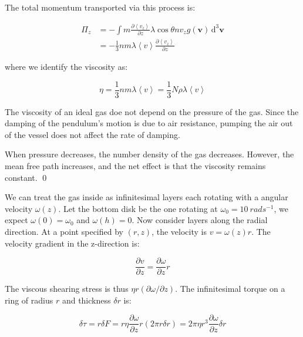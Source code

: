 \documentclass[12pt]{article}
\begin{document}
The total momentum transported via this process is:

\begin{equation}
\begin{split}
    \Pi_{z} &= -\int m \frac{\partial \left\langle v_{z} \right\rangle}{\partial z} \lambda \cos{\theta} n v_{z} g(\mathbf{v}) \, \mathrm{d}^{3} \mathbf{v} \\
    &= -\frac{1}{3} n m \lambda \left\langle v \right\rangle \frac{\partial \left\langle v_{z} \right\rangle}{\partial z}
\end{split}
\end{equation}

where we identify the viscosity as:

\begin{equation}
    \eta = \frac{1}{3} n m \lambda \left\langle v \right\rangle = \frac{1}{3} N \rho \lambda \left\langle v \right\rangle
\end{equation}

The viscosity of an ideal gas doe not depend on the pressure of the gas. Since the damping of the pendulum's motion is due to air resistance, pumping the air out of the vessel does not affect the rate of damping.

When pressure decreases, the number density of the gas decreases. However, the mean free path increases, and the net effect is that the viscosity remains constant.
\qed


We can treat the gas inside as infinitesimal layers each rotating with a angular velocity $\omega(z)$. Let the bottom disk be the one rotating at $\omega_{0} = \qty{10}{rad s^{-1}}$, we expect $\omega(0) = \omega_{0}$ and $\omega(h) = 0$. Now consider layers along the radial direction. At a point specified by $(r, z)$, the velocity is $v = \omega(z) r$. The velocity gradient in the z-direction is:

\begin{equation}
    \frac{\partial v}{\partial z} = \frac{\partial \omega}{\partial z} r
\end{equation}

The viscous shearing stress is thus $\eta r (\partial \omega/\partial z)$. The infinitesimal torque on a ring of radius $r$ and thickness $\delta r$ is:

\begin{equation}
    \delta \tau = r \delta F = r \eta \frac{\partial \omega}{\partial z} r (2\pi r \delta r) = 2\pi \eta r^{3} \frac{\partial \omega}{\partial z} \delta r
\end{equation}
\end{document}
